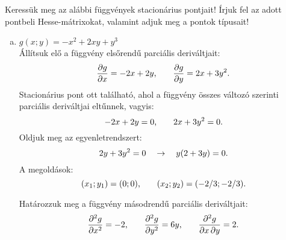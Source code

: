 \documentclass[exercise]{math-standalone}
\begin{document}
\begin{exercise}{%
    Keressük meg az alábbi függvények stacionárius pontjait! Írjuk fel az adott
    pontbeli Hesse-mátrixokat, valamint adjuk meg a pontok típusait!
  }
{\begin{enumerate}[a)]
\begin{enumerate}[1)]
              \item Most vizsgáljuk meg a mátrix determinánsát $(2/3; -2/3)$
                    pontban:
                    \[
                      \det \rmat H(2/3;-2/3) = \begin{vmatrix}
                        2 & 2 \\ 2 & 4
                      \end{vmatrix} = 4 \text.
                    \]
                    Mivel a determináns pozitív, ezért a stacionárius pont
                    egy lehetséges szélsőérték hely. Mivel a Hesse-mátrix
                    összes aldeterminánsa pozitív, ($\det \rmat H > 0$,
                    $h_{11} > 0$,) ezért ebben a pontban a függvénynek lokális
                    minimuma van.
            \end{enumerate}

            Összegezve tehát:
            \begin{alignat*}{9}
              f & (0  ; 0  )  &  & = 0 \quad     &  & \rightarrow \quad
              \text{nyeregpont,}
              \\
              f & (2/3; -2/3) &  & = -4/27 \quad &  & \rightarrow \quad
              \text{lokális minimum.}
            \end{alignat*}

      \item $g(x; y) = -x^2 + 2xy + y^3$\\[2mm]
            Állítsuk elő a függvény elsőrendű parciális deriváltjait:
            \[
              \pdv{g}{x} = -2x + 2y
              \text,
              \qquad
              \pdv{g}{y} = 2x + 3y^2
              \text.
            \]
            Stacionárius pont ott található, ahol a függvény összes változó
            szerinti parciális deriváltjai eltűnnek, vagyis:
            \[
              -2x + 2y = 0
              \text,
              \qquad
              2x + 3y^2 = 0
              \text.
            \]
            Oldjuk meg az egyenletrendszert:
            \[
              2y + 3y^2 = 0
              \quad \rightarrow \quad
              y(2 + 3y) = 0
              \text.
            \]
            A megoldások:
            \[
              (x_1; y_1) = (0; 0)
              \text, \qquad
              (x_2; y_2) = (-2/3; -2/3)
              \text.
            \]

            Határozzuk meg a függvény másodrendű parciális deriváltjait:
            \[
              \pdv[order=2]{g}{x} = -2 \text,
              \qquad
              \pdv[order=2]{g}{y} = 6y \text,
              \qquad
              \pdv{g}{x,y}        = 2 \text.
            \]


\end{enumerate}}
\end{exercise}
\end{document}
